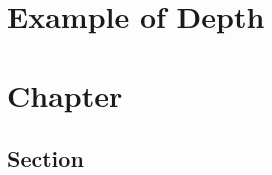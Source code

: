 \documentclass{depth_book}
\begin{document}
\chapter*{Example of Depth}
\blindtext[2]

\chapter{Chapter}
\blindtext[2]
\section{Section}
\blindtext[2]
\end{document}
